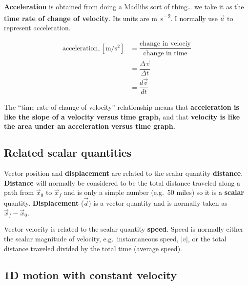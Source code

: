 \documentclass{tufte-handout}
\begin{document}
\textbf{Acceleration} is obtained from doing a Madlibs sort of
thing\ldots{} we take it as the \textbf{time rate of change of
velocity}. Its units are \unit{\meter\per\second\squared}. I normally
use \(\vec{a}\) to represent acceleration.

\begin{align}
\text{acceleration}, [\si{\meter\per\second\squared}] &= \dfrac{\text{change in velociy}}{\text{change in time}} \\
&= \dfrac{\Delta \vec{v}}{\Delta t} \\
&= \dfrac{d \vec{v}}{dt}
\end{align}

The ``time rate of change of velocity'' relationship means that
\textbf{acceleration is like the
slope of a velocity versus time graph,} and that \textbf{velocity is like
the area under an acceleration versus time graph.}

\hypertarget{related-scalar-quantities}{%
\subsection{Related scalar quantities}\label{related-scalar-quantities}}

Vector position and \textbf{displacement} are related to the scalar
quantity \textbf{distance}. \textbf{Distance} will normally be
considered to be the total distance traveled along a path from
\(\vec{x}_0\) to \(\vec{x}_f\) and is only a simple number (e.g.\ 50
miles) so it is a
\textbf{scalar} quantity. \textbf{Displacement} (\(\vec{d}\)) is a vector quantity and
is normally taken as \(\vec{x}_f - \vec{x}_0\).

Vector velocity is related to the scalar quantity \textbf{speed}. Speed
is normally either the scalar magnitude of velocity, e.g.~instantaneous
speed, \(|v|\), or the total distance traveled divided by the total time
(average speed).

\hypertarget{d-motion-with-constant-velocity}{%
\subsection{1D motion with constant
velocity}\label{d-motion-with-constant-velocity}}
\end{document}
